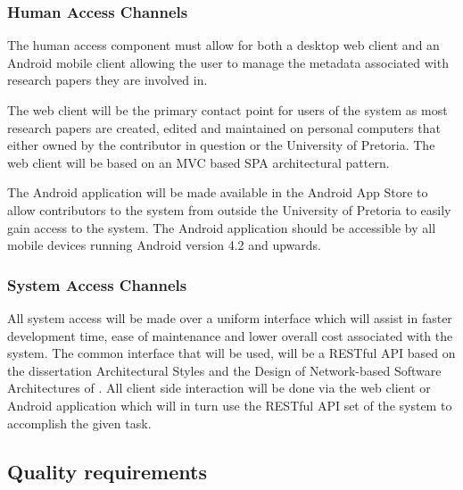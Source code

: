 \documentclass[a4paper,10pt]{article}
\begin{document}
\subsubsection{Human Access Channels}
The human access component must allow for both a desktop web client and an Android mobile client allowing the user to manage the metadata associated with research papers they are involved in. 

The web client will be the primary contact point for users of the system as most research papers are created, edited and maintained on personal computers that either owned by the contributor in question or the University of Pretoria. The web client will be based on an MVC based SPA architectural pattern. 

The Android application will be made available in the Android App Store to allow contributors to the system from outside the University of Pretoria to easily gain access to the system. The Android application should be accessible by all mobile devices running Android version 4.2 and upwards.

\subsubsection{System Access Channels}
All system access will be made over a uniform interface which will assist in faster development time, ease of maintenance and lower overall cost associated with the system. The common interface that will be used, will be a RESTful API based on the dissertation Architectural Styles and
the Design of Network-based Software Architectures of \textcite{fielding}.  All client side interaction will be done via the web client or Android application which will in turn use the RESTful API set of the system to accomplish the given task.

\subsection{Quality requirements}
\end{document}

